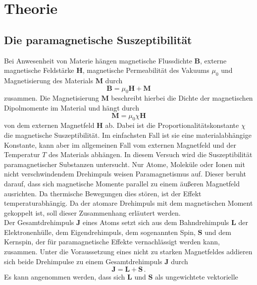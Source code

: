 \section{Theorie}
\label{sec:Theorie}

\subsection{Die paramagnetische Suszeptibilität}
\label{subsec:theoriesuszeptibilitaet}
Bei Anwesenheit von Materie hängen magnetische Flussdichte $\symbf{B}$, externe
magnetische Feldstärke $\symbf{H}$, magnetische Permeabilität des Vakuums $\mu_0$
und Magnetisierung des Materials $\symbf{M}$ durch
\begin{equation}
  \symbf{B} = \mu_0 \symbf{H} + \symbf{M}
  \label{eqn:bhm}
\end{equation}
zusammen. Die Magnetisierung $\symbf{M}$ beschreibt hierbei die Dichte der
magnetischen Dipolmomente im Material und hängt durch
\begin{equation}
  \symbf{M} = \mu_0 \chi \symbf{H}
  \label{eqn:mchih}
\end{equation}
von dem externen Magnetfeld $\symbf{H}$ ab. Dabei ist die Proportionalitätskonstante
$\chi$ die magnetische Suszeptibilität. Im einfachsten Fall ist sie eine materialabhängige
Konstante, kann aber im allgemeinen Fall vom externen Magnetfeld und der Temperatur $T$
des Materials abhängen.
In diesem Versuch wird die Suszeptibilität paramagnetischer Substanzen untersucht.
Nur Atome, Moleküle oder Ionen mit nicht verschwindendem Drehimpuls weisen
Paramagnetismus auf. Dieser beruht darauf, dass sich magnetische Momente parallel zu
einem äußeren Magnetfeld ausrichten. Da thermische Bewegungen dies stören, ist der Effekt
temperaturabhängig. Da der atomare Drehimpuls mit dem magnetischen Moment gekoppelt ist,
soll dieser Zusammenhang erläutert werden. \\
Der Gesamtdrehimpuls $\symbf{J}$ eines Atoms setzt sich aus dem Bahndrehimpuls
$\symbf{L}$ der Elektronenhülle, dem Eigendrehimpuls, dem sogenannten Spin, $\symbf{S}$
und dem Kernspin, der für paramagnetische Effekte vernachlässigt werden kann, zusammen.
Unter die Voraussetzung eines nicht zu starken Magnetfeldes addieren sich beide
Drehimpulse zu einem Gesamtdrehimpuls $\symbf{J}$ durch
\begin{equation}
  \symbf{J} = \symbf{L} + \symbf{S}\,.
  \label{eqn:ls}
\end{equation}
Es kann angenommen werden, dass sich $\symbf{L}$ und $\symbf{S}$ als ungewichtete vektorielle
